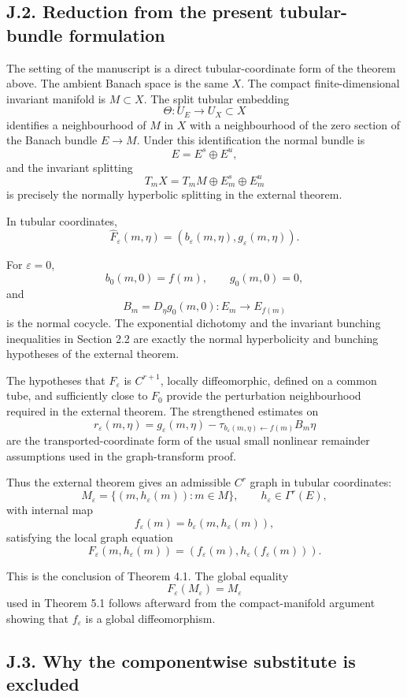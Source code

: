 \documentclass[12pt,a4paper]{article}
\theoremstyle{plain}
\numberwithin{equation}{section}
\numberwithin{theorem}{section}
\begin{document}
\subsection{J.2. Reduction from the present tubular-bundle formulation}

The setting of the manuscript is a direct tubular-coordinate form of the theorem above. The ambient Banach space is the same $X$. The compact finite-dimensional invariant manifold is $M\subset X$. The split tubular embedding
\[
\Theta:U_E\to U_X\subset X
\]
identifies a neighbourhood of $M$ in $X$ with a neighbourhood of the zero section of the Banach bundle $E\to M$. Under this identification the normal bundle is
\[
E=E^s\oplus E^u,
\]
and the invariant splitting
\[
T_mX=T_mM\oplus E_m^s\oplus E_m^u
\]
is precisely the normally hyperbolic splitting in the external theorem.

In tubular coordinates,
\[
\widehat F_\varepsilon(m,\eta)
=
(b_\varepsilon(m,\eta),g_\varepsilon(m,\eta)).
\]

For $\varepsilon=0$,
\[
b_0(m,0)=f(m),
\qquad
 g_0(m,0)=0,
\]
and
\[
B_m=D_\eta g_0(m,0):E_m\to E_{f(m)}
\]
is the normal cocycle. The exponential dichotomy and the invariant bunching inequalities in Section 2.2 are exactly the normal hyperbolicity and bunching hypotheses of the external theorem.

The hypotheses that $F_\varepsilon$ is $C^{r+1}$, locally diffeomorphic, defined on a common tube, and sufficiently close to $F_0$ provide the perturbation neighbourhood required in the external theorem. The strengthened estimates on
\[
r_\varepsilon(m,\eta)
=
g_\varepsilon(m,\eta)
-
\tau_{b_\varepsilon(m,\eta)\leftarrow f(m)}B_m\eta
\]
are the transported-coordinate form of the usual small nonlinear remainder assumptions used in the graph-transform proof.

Thus the external theorem gives an admissible $C^r$ graph in tubular coordinates:
\[
M_\varepsilon=
\{(m,h_\varepsilon(m)):m\in M\},
\qquad
h_\varepsilon\in\Gamma^r(E),
\]
with internal map
\[
f_\varepsilon(m)=b_\varepsilon(m,h_\varepsilon(m)),
\]
satisfying the local graph equation
\[
F_\varepsilon(m,h_\varepsilon(m))
=
(f_\varepsilon(m),h_\varepsilon(f_\varepsilon(m))).
\]

This is the conclusion of Theorem 4.1. The global equality
\[
F_\varepsilon(M_\varepsilon)=M_\varepsilon
\]
used in Theorem 5.1 follows afterward from the compact-manifold argument showing that $f_\varepsilon$ is a global diffeomorphism.

\subsection{J.3. Why the componentwise substitute is excluded}
\end{document}
